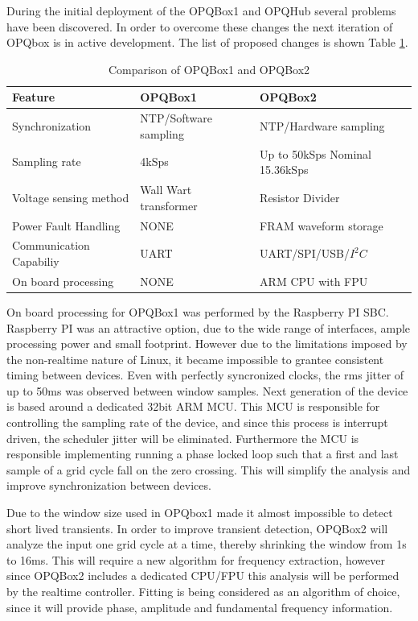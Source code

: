 During the initial deployment of the OPQBox1 and OPQHub several problems have been discovered. In order to overcome these changes the next iteration of OPQbox is in active development.
The list of proposed  changes is shown Table \ref{tbl:comp}. 

\begin{table}[h!]
\caption{Comparison of OPQBox1 and OPQBox2}
\label{tbl:comp}
\begin{tabular}{|l|l|l|}
\hline
\textbf{Feature}        & \textbf{OPQBox1}               & \textbf{OPQBox2}                     \\ \hline
Synchronization         & NTP/Software sampling    & NTP/Hardware sampling         				 	\\ \hline
Sampling rate           & 4kSps                 & Up to 50kSps Nominal 15.36kSps 					\\ \hline
Voltage sensing method  & Wall Wart transformer & Resistor Divider            					\\ \hline
Power Fault Handling    & NONE                  & FRAM waveform storage       					\\ \hline
Communication Capabiliy & UART                  & UART/SPI/USB/$I^2C$               					\\ \hline
On board processing     & NONE					& ARM CPU with FPU								\\ \hline
\end{tabular}
\end{table}

On board processing for OPQBox1 was performed by the Raspberry PI SBC. Raspberry PI was an attractive option, due to the wide range of interfaces, ample processing power and small
footprint. However due to the limitations imposed by the non-realtime nature of Linux, it became impossible to grantee consistent timing between devices. Even with perfectly syncronized
clocks, the rms jitter of up to 50ms was observed between window samples. Next generation of the device is based around a dedicated 32bit ARM MCU. This MCU is responsible for controlling
the sampling rate of the device, and since this process is interrupt driven, the scheduler jitter will be eliminated. Furthermore the MCU is responsible implementing running a 
phase locked loop such that a first and last sample of a grid cycle fall on the zero crossing. This will simplify the analysis and improve synchronization between devices.

Due to the window size used in OPQbox1 made it almost impossible to detect short lived transients. In order to improve transient detection, OPQBox2 will analyze the input one grid cycle 
at a time, thereby shrinking the window from 1s to 16ms. This will require a new algorithm for frequency extraction, however since OPQBox2 includes a dedicated CPU/FPU this analysis will be performed by the realtime controller. Fitting is being considered as an algorithm of choice, since it will provide phase, amplitude and fundamental frequency information.


